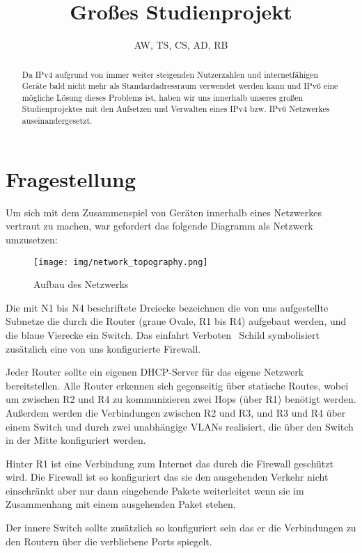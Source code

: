 \documentclass[10pt,a4paper]{article}
\author{AW, TS, CS, AD, RB}
\title{Großes Studienprojekt}
\begin{document}
	\maketitle
	\begin{abstract}
		Da IPv4 aufgrund von immer weiter steigenden Nutzerzahlen und internetfähigen Geräte bald nicht mehr als Standardadressraum verwendet werden kann und IPv6 eine mögliche Lösung dieses Problems ist, haben wir uns innerhalb unseres großen Studienprojektes  mit den Aufsetzen und Verwalten eines IPv4 bzw. IPv6 Netzwerkes auseinandergesetzt. 
	\end{abstract}
	\section{Fragestellung}
	Um sich mit dem Zusammenspiel von Geräten innerhalb eines Netzwerkes vertraut zu machen, war gefordert das folgende Diagramm als Netzwerk umzusetzen:
	\begin{figure}[ht]
		\texttt{[image: img/network\_topography.png]}
		\centering
		\caption{Aufbau des Netzwerks}
	\end{figure}
\par
	Die mit N1 bis N4 beschriftete Dreiecke bezeichnen die von uns aufgestellte Subnetze die durch die Router (graue Ovale, R1 bis R4) aufgebaut werden, und die blaue Vierecke ein Switch. Das \glqq einfahrt Verboten\grqq~ Schild symbolisiert zusätzlich eine von uns konfigurierte Firewall.
\par
	Jeder Router sollte ein eigenen DHCP-Server für das eigene Netzwerk bereitstellen. Alle Router erkennen sich gegenseitig über statische Routes, wobei um zwischen R2 und R4 zu kommunizieren zwei Hops (über R1) benötigt werden. Außerdem werden die Verbindungen zwischen R2 und R3, und R3 und R4 über einem Switch und durch zwei unabhängige VLANs realisiert, die über den Switch in der Mitte konfiguriert werden.
\par
	Hinter R1 ist eine Verbindung zum Internet das durch die Firewall geschützt wird. Die Firewall ist so konfiguriert das sie den ausgehenden Verkehr nicht einschränkt aber nur dann eingehende Pakete weiterleitet wenn sie im Zusammenhang mit einem ausgehenden Paket stehen.
\par
	Der innere Switch sollte zusätzlich so konfiguriert sein das er die Verbindungen zu den Routern über die verbliebene Ports spiegelt.
	
\end{document}
